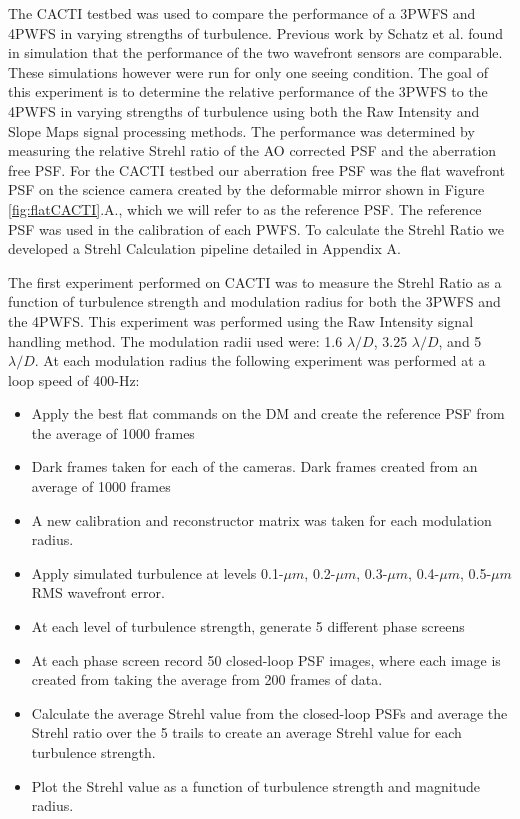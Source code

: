 The CACTI testbed was used to compare the performance of a 3PWFS and 4PWFS in varying strengths of turbulence. Previous work by Schatz et al. found in simulation that the performance of the two wavefront sensors are comparable. These simulations however were run for only one seeing condition. The goal of this experiment is to determine the relative performance of the 3PWFS to the 4PWFS in varying strengths of turbulence using both the Raw Intensity and Slope Maps signal processing methods. The performance was determined by measuring the relative Strehl ratio of the AO corrected PSF and the aberration free PSF. For the CACTI testbed our aberration free PSF was the flat wavefront PSF on the science camera created by the deformable mirror shown in Figure \ref{fig:flatCACTI}.A., which we will refer to as the reference PSF. The reference PSF was used in the calibration of each PWFS. To calculate the Strehl Ratio we developed a Strehl Calculation pipeline detailed in Appendix A.

The first experiment performed on CACTI was to measure the Strehl Ratio as a function of turbulence strength and modulation radius for both the 3PWFS and the 4PWFS.  This experiment was performed using the Raw Intensity signal handling method. The modulation radii used were: 1.6 $\lambda/D$, 3.25 $\lambda/D$, and 5 $\lambda/D$. At each modulation radius the following experiment was performed at a loop speed of 400-Hz:

\begin{itemize}
    \item Apply the best flat commands on the DM and create the reference PSF from the average of 1000 frames
    \item Dark frames taken for each of the cameras. Dark frames created from an average of 1000 frames
    \item A new calibration and reconstructor matrix was taken for each modulation radius.
    \item Apply simulated turbulence at levels 0.1-$\mu m$, 0.2-$\mu m$, 0.3-$\mu m$, 0.4-$\mu m$, 0.5-$\mu m$ RMS wavefront error. 
    \item At each level of turbulence strength, generate 5 different phase screens
    \item At each phase screen record 50 closed-loop PSF images, where each image is created from taking the average from 200 frames of data. 
    \item Calculate the average Strehl value from the closed-loop PSFs and average the Strehl ratio over the 5 trails to create an average Strehl value for each turbulence strength.
    \item Plot the Strehl value as a function of turbulence strength and magnitude radius. 
    

\end{itemize}




